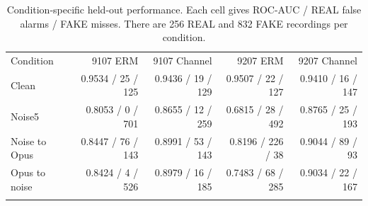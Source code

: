 \begin{table}[t]
\caption{Condition-specific held-out performance. Each cell gives ROC-AUC / REAL false alarms / FAKE misses. There are 256 REAL and 832 FAKE recordings per condition.}\label{tab:heldout-conditions}
\centering
\small
\begin{tabular}{@{}lrrrr@{}}
\toprule
Condition & 9107 ERM & 9107 Channel & 9207 ERM & 9207 Channel \\
\colrule
Clean & 0.9534 / 25 / 125 & 0.9436 / 19 / 129 & 0.9507 / 22 / 127 & 0.9410 / 16 / 147 \\
Noise5 & 0.8053 / 0 / 701 & 0.8655 / 12 / 259 & 0.6815 / 28 / 492 & 0.8765 / 25 / 193 \\
Noise to Opus & 0.8447 / 76 / 143 & 0.8991 / 53 / 143 & 0.8196 / 226 / 38 & 0.9044 / 89 / 93 \\
Opus to noise & 0.8424 / 4 / 526 & 0.8979 / 16 / 185 & 0.7483 / 68 / 285 & 0.9034 / 22 / 167 \\
\botrule
\end{tabular}
\end{table}
